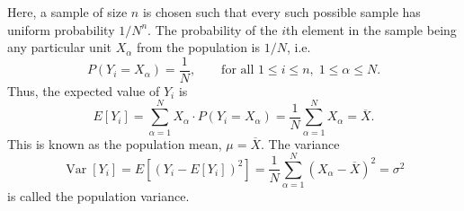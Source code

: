 \documentclass[11pt]{article}
\DeclareMathOperator{\var}{Var}
\theoremstyle{definition}
\theoremstyle{remark}
\numberwithin{equation}{section}
\begin{document}
    Here, a sample of size $n$ is chosen such that every such possible sample has
    uniform probability $1 / N^n$. The probability of the $i$th element in the sample
    being any particular unit $X_\alpha$ from the population is $1 / N$, i.e.\ \[
        P(Y_i = X_\alpha) = \frac{1}{N}, \qquad \text{for all } 1 \leq i \leq n,\; 1
        \leq \alpha \leq N.
    \] Thus, the expected value of $Y_i$ is \[
        E[Y_i] = \sum_{\alpha = 1}^N X_\alpha\cdot P(Y_i = X_\alpha) =
        \frac{1}{N}\sum_{\alpha = 1}^N X_\alpha = \overline{X}.
    \] This is known as the population mean, $\mu = \overline{X}$. The variance \[
        \var[Y_i] = E[(Y_i - E[Y_i])^2] = \frac{1}{N}\sum_{\alpha = 1}^N (X_\alpha -
        \overline{X})^2 = \sigma^2
    \] is called the population variance.
    
    
    
\end{document}
